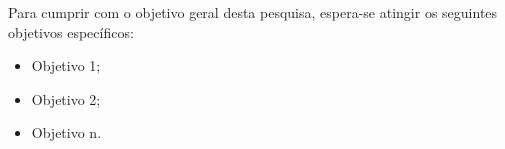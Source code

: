 \justify

Para cumprir com o objetivo geral desta pesquisa, espera-se atingir os
seguintes objetivos específicos:

\begin{itemize}
	\item Objetivo 1;
	\item Objetivo 2;
	\item Objetivo n.
\end{itemize}
